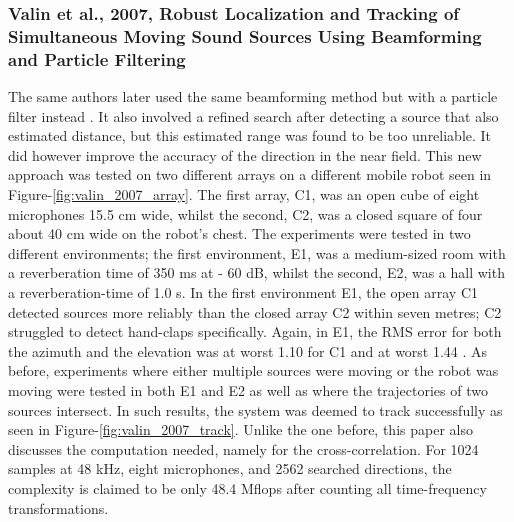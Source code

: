 \documentclass{report}
\begin{document}
\subsubsection{Valin et al., 2007, Robust Localization and Tracking of Simultaneous Moving Sound Sources Using Beamforming and Particle Filtering}

The same authors later used the same beamforming method but with a particle filter instead \cite{valin_robust_2007}. It also involved a refined search after detecting a source that also estimated distance, but this estimated range was found to be too unreliable. It did however improve the accuracy of the direction in the near field. This new approach was tested on two different arrays on a different mobile robot seen in Figure-\ref{fig:valin_2007_array}. The first array, C1, was an open cube of eight microphones 15.5 \si{cm} wide, whilst the second, C2, was a closed square of four about 40 \si{cm} wide on the robot's chest. The experiments were tested in two different environments; the first environment, E1, was a medium-sized room with a reverberation time of 350 \si{ms} at - 60 \si{dB}, whilst the second, E2, was a hall with a reverberation-time of 1.0 \si{s}. In the first environment E1, the open array C1 detected sources more reliably than the closed array C2 within seven metres; C2 struggled to detect hand-claps specifically. Again, in E1, the RMS error for both the azimuth and the elevation was at worst 1.10 \si{\deg} for C1 and at worst 1.44 \si{\deg}. As before, experiments where either multiple sources were moving or the robot was moving were tested in both E1 and E2 as well as where the trajectories of two sources intersect. In such results, the system was deemed to track successfully as seen in Figure-\ref{fig:valin_2007_track}. Unlike the one before, this paper also discusses the computation needed, namely for the cross-correlation. For 1024 samples at 48 \si{kHz}, eight microphones, and 2562 searched directions, the complexity is claimed to be only 48.4 \si{Mflops} after counting all time-frequency transformations.
\end{document}
